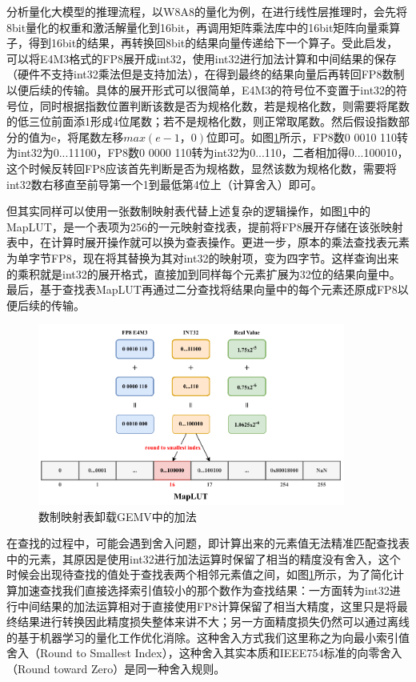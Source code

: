 分析量化大模型的推理流程，以W8A8的量化为例，在进行线性层推理时，会先将8bit量化的权重和激活解量化到16bit，再调用矩阵乘法库中的16bit矩阵向量乘算子，得到16bit的结果，再转换回8bit的结果向量传递给下一个算子。受此启发，
可以将E4M3格式的FP8展开成int32，使用int32进行加法计算和中间结果的保存（硬件不支持int32乘法但是支持加法），在得到最终的结果向量后再转回FP8数制以便后续的传输。具体的展开形式可以很简单，E4M3的符号位不变置于int32的符号位，同时根据指数位置判断该数是否为规格化数，若是规格化数，则需要将尾数的低三位前面添1形成4位尾数；若不是规格化数，则正常取尾数。然后假设指数部分的值为e，将尾数左移$max(e-1，0)$位即可。如图\ref{LUTBS}所示，FP8数0 0010 110转为int32为0...11100，FP8数0 0000 110转为int32为0...110，二者相加得0...100010，这个时候反转回FP8应该首先判断是否为规格数，显然该数为规格化数，需要将int32数右移直至前导第一个1到最低第4位上（计算舍入）即可。

但其实同样可以使用一张数制映射表代替上述复杂的逻辑操作，如图\ref{LUTBS}中的MapLUT，是一个表项为256的一元映射查找表，提前将FP8展开存储在该张映射表中，在计算时展开操作就可以换为查表操作。更进一步，原本的乘法查找表元素为单字节FP8，现在将其替换为其对int32的映射项，变为四字节。这样查询出来的乘积就是int32的展开格式，直接加到同样每个元素扩展为32位的结果向量中。最后，基于查找表MapLUT再通过二分查找将结果向量中的每个元素还原成FP8以便后续的传输。

\begin{figure}[!htbp]
	\centering
    \includegraphics[width=0.9\textwidth]{figures/BinarySearch.pdf}
	\caption{数制映射表卸载GEMV中的加法}
    \label{LUTBS}
\end{figure}

在查找的过程中，可能会遇到舍入问题，即计算出来的元素值无法精准匹配查找表中的元素，其原因是使用int32进行加法运算时保留了相当的精度没有舍入，这个时候会出现待查找的值处于查找表两个相邻元素值之间，如图\ref{LUTBS}所示，为了简化计算加速查找我们直接选择索引值较小的那个数作为查找结果：一方面转为int32进行中间结果的加法运算相对于直接使用FP8计算保留了相当大精度，这里只是将最终结果进行转换因此精度损失整体来讲不大；另一方面精度损失仍然可以通过离线的基于机器学习的量化工作优化消除。这种舍入方式我们这里称之为向最小索引值舍入（Round to Smallest Index），这种舍入其实本质和IEEE754标准的向零舍入（Round toward Zero）是同一种舍入规则。

